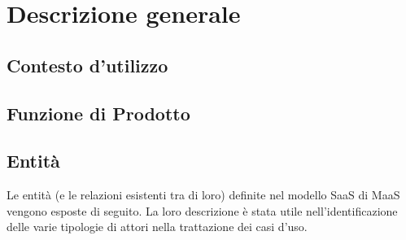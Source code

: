 \section{Descrizione generale}
\subsection{Contesto d'utilizzo}

\subsection{Funzione di Prodotto}

\subsection{Entit\`a}
Le entit\`a (e le relazioni esistenti tra di loro) definite nel modello SaaS di MaaS vengono esposte di seguito. La loro descrizione \`e stata utile nell'identificazione delle varie tipologie di attori nella trattazione dei casi d'uso.
